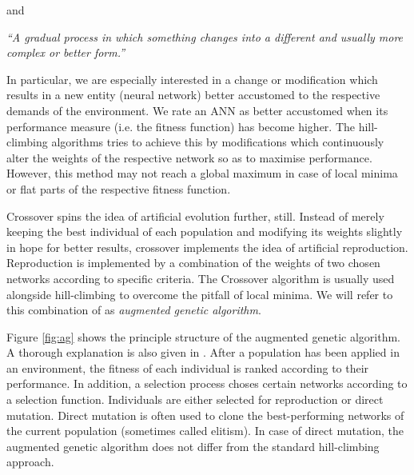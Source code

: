 \documentclass[10pt,a4paper,DIV=11]{scrreprt}
\begin{document}
and

\begin{center}
\textit{“A gradual process in which something changes into a different and usually more complex or better form.”}\\ 
\end{center}

In particular, we are especially interested in a change or modification which results in a new entity (neural network) better accustomed to the respective demands of the environment.
We rate an ANN as better accustomed when its performance measure (i.e. the fitness function) has become higher. The hill-climbing algorithms tries to achieve this by modifications which continuously alter
the weights of the respective network so as to maximise performance. However, this method may not reach a global maximum in case of local minima or flat parts of the respective fitness function.

Crossover spins the idea of artificial evolution further, still. Instead of merely keeping the best individual of each population and modifying its weights slightly in hope for better 
results, crossover implements the idea of artificial reproduction. Reproduction is implemented by a combination of the weights of two chosen networks according to specific criteria. The Crossover
algorithm is usually used alongside hill-climbing to overcome the pitfall of local minima. We will refer to this combination of as \textit{augmented genetic algorithm}.

Figure \ref{fig:ag} shows the principle structure of the augmented genetic algorithm. A thorough explanation is also given in \cite{CROSSOVER}.
After a population has been applied in an environment, the fitness of each individual is ranked according to their performance.  In addition, a selection process choses certain networks according to a selection function. Individuals are either selected for reproduction or direct mutation. Direct mutation is
often used to clone the best-performing networks of the current population (sometimes called elitism). In case of direct mutation, the augmented genetic algorithm does not differ from the standard hill-climbing approach.
\end{document}
